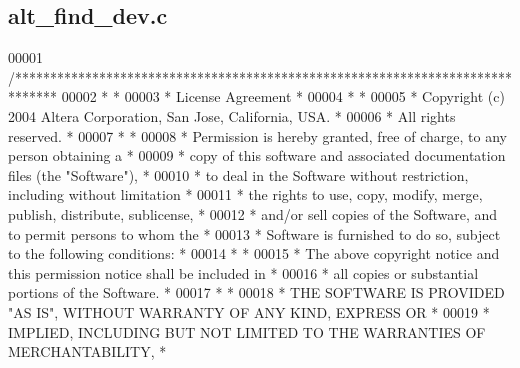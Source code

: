 \subsection{alt\+\_\+find\+\_\+dev.\+c}
\label{alt__find__dev_8c_source}

\begin{DoxyCode}
00001 \textcolor{comment}{/******************************************************************************}
00002 \textcolor{comment}{*                                                                             *}
00003 \textcolor{comment}{* License Agreement                                                           *}
00004 \textcolor{comment}{*                                                                             *}
00005 \textcolor{comment}{* Copyright (c) 2004 Altera Corporation, San Jose, California, USA.           *}
00006 \textcolor{comment}{* All rights reserved.                                                        *}
00007 \textcolor{comment}{*                                                                             *}
00008 \textcolor{comment}{* Permission is hereby granted, free of charge, to any person obtaining a     *}
00009 \textcolor{comment}{* copy of this software and associated documentation files (the "Software"),  *}
00010 \textcolor{comment}{* to deal in the Software without restriction, including without limitation   *}
00011 \textcolor{comment}{* the rights to use, copy, modify, merge, publish, distribute, sublicense,    *}
00012 \textcolor{comment}{* and/or sell copies of the Software, and to permit persons to whom the       *}
00013 \textcolor{comment}{* Software is furnished to do so, subject to the following conditions:        *}
00014 \textcolor{comment}{*                                                                             *}
00015 \textcolor{comment}{* The above copyright notice and this permission notice shall be included in  *}
00016 \textcolor{comment}{* all copies or substantial portions of the Software.                         *}
00017 \textcolor{comment}{*                                                                             *}
00018 \textcolor{comment}{* THE SOFTWARE IS PROVIDED "AS IS", WITHOUT WARRANTY OF ANY KIND, EXPRESS OR  *}
00019 \textcolor{comment}{* IMPLIED, INCLUDING BUT NOT LIMITED TO THE WARRANTIES OF MERCHANTABILITY,    *}

\end{DoxyCode}
